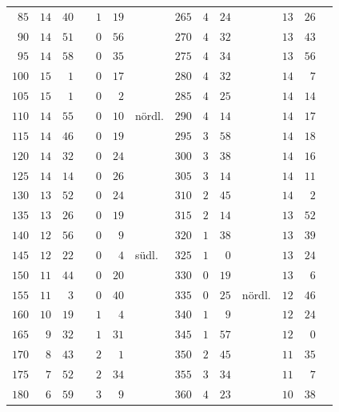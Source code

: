 \begin{center}
\begin{tabular}{r|rrl|rrl||r|rrl|rrl}
$85$&$14$&$40$&&$1$&$19$&&$265$&$4$&$24$&&$13$&$26$&\\
$90$&$14$&$51$&&$0$&$56$&&$270$&$4$&$32$&&$13$&$43$&\\
$95$&$14$&$58$&&$0$&$35$&&$275$&$4$&$34$&&$13$&$56$&\\
$100$&$15$&$1$&&$0$&$17$&&$280$&$4$&$32$&&$14$&$7$&\\
$105$&$15$&$1$&&$0$&$2$&&$285$&$4$&$25$&&$14$&$14$&\\
$110$&$14$&$55$&&$0$&$10$&nördl.&$290$&$4$&$14$&&$14$&$17$&\\
$115$&$14$&$46$&&$0$&$19$&&$295$&$3$&$58$&&$14$&$18$&\\
$120$&$14$&$32$&&$0$&$24$&&$300$&$3$&$38$&&$14$&$16$&\\
$125$&$14$&$14$&&$0$&$26$&&$305$&$3$&$14$&&$14$&$11$&\\
$130$&$13$&$52$&&$0$&$24$&&$310$&$2$&$45$&&$14$&$2$&\\
$135$&$13$&$26$&&$0$&$19$&&$315$&$2$&$14$&&$13$&$52$&\\
$140$&$12$&$56$&&$0$&$9$&&$320$&$1$&$38$&&$13$&$39$&\\
$145$&$12$&$22$&&$0$&$4$&südl.&$325$&$1$&$0$&&$13$&$24$&\\
$150$&$11$&$44$&&$0$&$20$&&$330$&$0$&$19$&&$13$&$6$&\\
$155$&$11$&$3$&&$0$&$40$&&$335$&$0$&$25$&nördl.&$12$&$46$&\\
$160$&$10$&$19$&&$1$&$4$&&$340$&$1$&$9$&&$12$&$24$&\\
$165$&$9$&$32$&&$1$&$31$&&$345$&$1$&$57$&&$12$&$0$&\\
$170$&$8$&$43$&&$2$&$1$&&$350$&$2$&$45$&&$11$&$35$&\\
$175$&$7$&$52$&&$2$&$34$&&$355$&$3$&$34$&&$11$&$7$&\\
$180$&$6$&$59$&&$3$&$9$&&$360$&$4$&$23$&&$10$&$38$&\\
\end{tabular}
\endgroup
\end{center}
